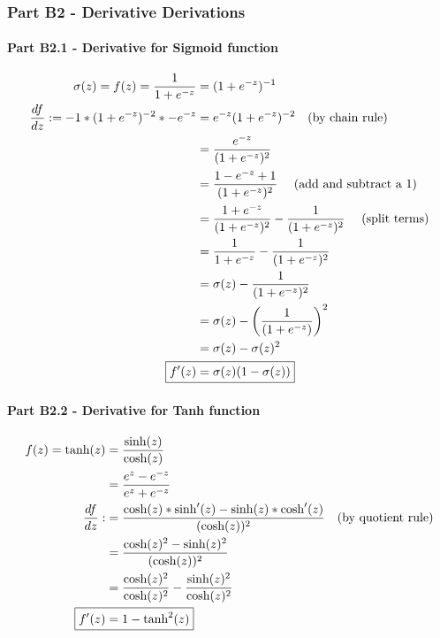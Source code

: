 \documentclass[]{article}
\begin{document}
\subsubsection{Part B2 - Derivative Derivations}
\paragraph{ Part B2.1 -  Derivative for Sigmoid function}
\begin{align*} 
\sigma(z)= f(z) = \frac{1}{1+e^{-z}}  &= (1+ e^{-z})^{-1} \\
\frac{df}{dz} : = -1* (1+ e^{-z})^{-2} * -e^{-z}  &= e^{-z}(1+ e^{-z})^{-2}  \text{~~~(by chain rule)}\\
 &= \frac{e^{-z}}{(1+ e^{-z})^{2}  } \\
 &= \frac{1-e^{-z}+1}{(1+ e^{-z})^{2}  }\text{  ~~~(add and subtract a 1)} \\
 &= \frac{1+e^{-z}}{(1+ e^{-z})^{2} } -  \frac{1}{(1+ e^{-z})^{2} }  \text{  ~~~(split terms)}\\
 &= \frac{1}{1+ e^{-z} } -  \frac{1}{(1+ e^{-z})^{2} }  \\
 &= \sigma(z) -  \frac{1}{(1+ e^{-z})^{2} }  \\
 &= \sigma(z) -  \left ( \frac{1}{(1+ e^{-z}) } \right )^2  \\
 &= \sigma(z) -  \sigma(z)^2  \\
\Aboxed{f'(z) &= \sigma(z) (1-  \sigma(z)) } \\
\end{align*}

\paragraph{Part B2.2 - Derivative for Tanh function}

\begin{align*} 
f(z) = \text{tanh}(z) &= \frac{\text{sinh}(z)}{\text{cosh}(z)} \\
&= \frac{e^z - e^{-z}}{e^z + e^{-z}} \\
\frac{df}{dz} : &=  \frac{\text{cosh}(z) * \text{sinh}'(z) -  \text{sinh}(z)  * \text{cosh}'(z)}{(\text{cosh}(z))^2}  \text{~~~(by quotient rule)} \\ 
&=  \frac{\text{cosh}(z)^2 -  \text{sinh}(z)^2 }{(\text{cosh}(z))^2} \\ 
&=  \frac{\text{cosh}(z)^2}{\text{cosh}(z)^2} - \frac{\text{sinh}(z)^2}{\text{cosh}(z)^2}\\ 
\Aboxed{f'(z) &= 1- \text{tanh}^2(z)}\\ 
\end{align*}
\end{document}
